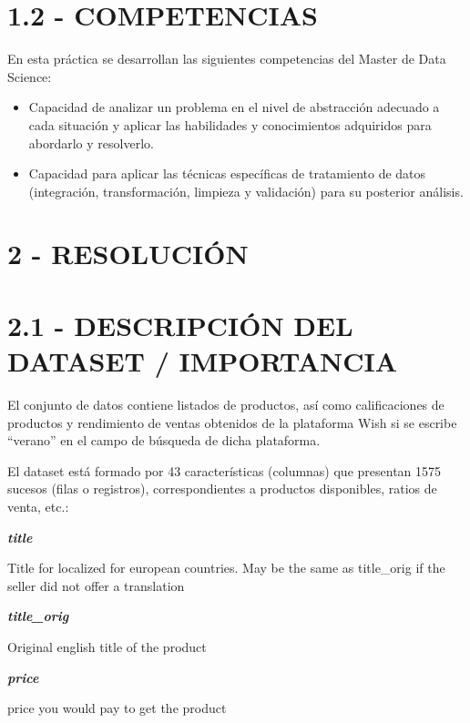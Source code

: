 \documentclass[
]{article}
\begin{document}
\hypertarget{competencias}{%
\section{1.2 - COMPETENCIAS}\label{competencias}}

En esta práctica se desarrollan las siguientes competencias del Master
de Data Science:

\begin{itemize}
\item
  Capacidad de analizar un problema en el nivel de abstracción adecuado
  a cada situación y aplicar las habilidades y conocimientos adquiridos
  para abordarlo y resolverlo.
\item
  Capacidad para aplicar las técnicas específicas de tratamiento de
  datos (integración, transformación, limpieza y validación) para su
  posterior análisis.
\end{itemize}

\hypertarget{resoluciuxf3n}{%
\section{2 - RESOLUCIÓN}\label{resoluciuxf3n}}

\hypertarget{descripciuxf3n-del-dataset-importancia}{%
\section{2.1 - DESCRIPCIÓN DEL DATASET /
IMPORTANCIA}\label{descripciuxf3n-del-dataset-importancia}}

El conjunto de datos contiene listados de productos, así como
calificaciones de productos y rendimiento de ventas obtenidos de la
plataforma Wish si se escribe ``verano'' en el campo de búsqueda de
dicha plataforma.

El dataset está formado por 43 características (columnas) que presentan
1575 sucesos (filas o registros), correspondientes a productos
disponibles, ratios de venta, etc.:

\textbf{\emph{title}}

Title for localized for european countries. May be the same as
title\_orig if the seller did not offer a translation

\textbf{\emph{title\_orig}}

Original english title of the product

\textbf{\emph{price}}

price you would pay to get the product
\end{document}
